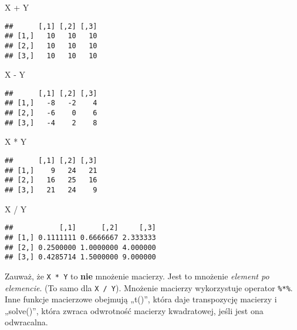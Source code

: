 \documentclass[
]{article}
\newenvironment{Shaded}{\begin{snugshade}}{\end{snugshade}}
\newcommand{\NormalTok}[1]{#1}
\newcommand{\SpecialCharTok}[1]{\textcolor[rgb]{0.00,0.00,0.00}{#1}}
\begin{document}
\begin{Shaded}
\begin{Highlighting}[]
\NormalTok{X }\SpecialCharTok{+}\NormalTok{ Y}
\end{Highlighting}
\end{Shaded}

\begin{verbatim}
##      [,1] [,2] [,3]
## [1,]   10   10   10
## [2,]   10   10   10
## [3,]   10   10   10
\end{verbatim}

\begin{Shaded}
\begin{Highlighting}[]
\NormalTok{X }\SpecialCharTok{{-}}\NormalTok{ Y}
\end{Highlighting}
\end{Shaded}

\begin{verbatim}
##      [,1] [,2] [,3]
## [1,]   -8   -2    4
## [2,]   -6    0    6
## [3,]   -4    2    8
\end{verbatim}

\begin{Shaded}
\begin{Highlighting}[]
\NormalTok{X }\SpecialCharTok{*}\NormalTok{ Y}
\end{Highlighting}
\end{Shaded}

\begin{verbatim}
##      [,1] [,2] [,3]
## [1,]    9   24   21
## [2,]   16   25   16
## [3,]   21   24    9
\end{verbatim}

\begin{Shaded}
\begin{Highlighting}[]
\NormalTok{X }\SpecialCharTok{/}\NormalTok{ Y}
\end{Highlighting}
\end{Shaded}

\begin{verbatim}
##           [,1]      [,2]     [,3]
## [1,] 0.1111111 0.6666667 2.333333
## [2,] 0.2500000 1.0000000 4.000000
## [3,] 0.4285714 1.5000000 9.000000
\end{verbatim}

Zauważ, że \texttt{X\ *\ Y} to \textbf{nie} mnożenie macierzy. Jest to
mnożenie \emph{element po elemencie}. (To samo dla \texttt{X\ /\ Y}).
Mnożenie macierzy wykorzystuje operator \texttt{\%*\%}. Inne funkcje
macierzowe obejmują „t()'', która daje transpozycję macierzy i
„solve()'', która zwraca odwrotność macierzy kwadratowej, jeśli jest ona
odwracalna.
\end{document}
